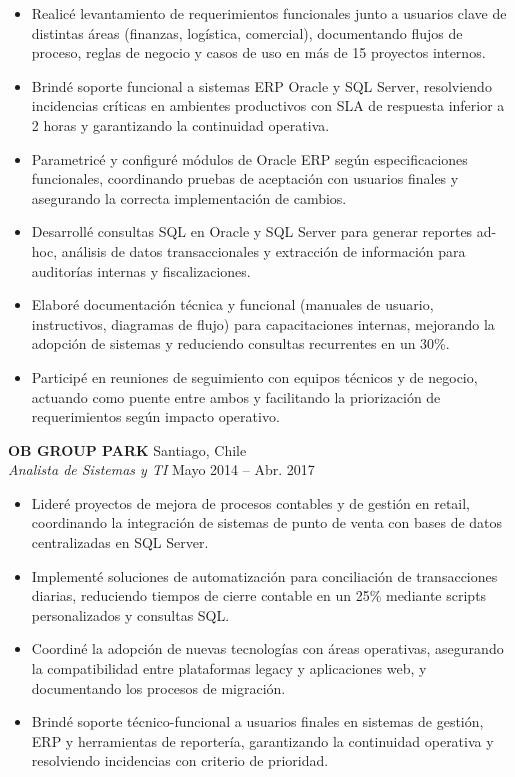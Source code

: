 \documentclass[11pt,letterpaper]{article}
\begin{document}
\begin{itemize}
  \item Realicé levantamiento de requerimientos funcionales junto a usuarios clave de distintas áreas (finanzas, logística, comercial), documentando flujos de proceso, reglas de negocio y casos de uso en más de 15 proyectos internos.
  \item Brindé soporte funcional a sistemas ERP Oracle y SQL Server, resolviendo incidencias críticas en ambientes productivos con SLA de respuesta inferior a 2 horas y garantizando la continuidad operativa.
  \item Parametricé y configuré módulos de Oracle ERP según especificaciones funcionales, coordinando pruebas de aceptación con usuarios finales y asegurando la correcta implementación de cambios.
  \item Desarrollé consultas SQL en Oracle y SQL Server para generar reportes ad-hoc, análisis de datos transaccionales y extracción de información para auditorías internas y fiscalizaciones.
  \item Elaboré documentación técnica y funcional (manuales de usuario, instructivos, diagramas de flujo) para capacitaciones internas, mejorando la adopción de sistemas y reduciendo consultas recurrentes en un 30\%.
  \item Participé en reuniones de seguimiento con equipos técnicos y de negocio, actuando como puente entre ambos y facilitando la priorización de requerimientos según impacto operativo.
\end{itemize}
\vspace{2pt}
\textbf{OB GROUP PARK} \hfill Santiago, Chile\\
\textit{Analista de Sistemas y TI} \hfill Mayo 2014 – Abr. 2017
\begin{itemize}
  \item Lideré proyectos de mejora de procesos contables y de gestión en retail, coordinando la integración de sistemas de punto de venta con bases de datos centralizadas en SQL Server.
  \item Implementé soluciones de automatización para conciliación de transacciones diarias, reduciendo tiempos de cierre contable en un 25\% mediante scripts personalizados y consultas SQL.
  \item Coordiné la adopción de nuevas tecnologías con áreas operativas, asegurando la compatibilidad entre plataformas legacy y aplicaciones web, y documentando los procesos de migración.
  \item Brindé soporte técnico-funcional a usuarios finales en sistemas de gestión, ERP y herramientas de reportería, garantizando la continuidad operativa y resolviendo incidencias con criterio de prioridad.
\end{itemize}
\end{document}
